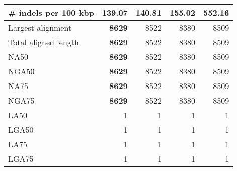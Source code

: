 \documentclass[12pt,a4paper]{article}
\begin{document}
\begin{table}[ht]
\begin{center}
\begin{tabular}{|l*{4}{|r}|}
\# indels per 100 kbp & {\bf 139.07} & 140.81 & 155.02 & 552.16 \\ \hline
Largest alignment & {\bf 8629} & 8522 & 8380 & 8509 \\ \hline
Total aligned length & {\bf 8629} & 8522 & 8380 & 8509 \\ \hline
NA50 & {\bf 8629} & 8522 & 8380 & 8509 \\ \hline
NGA50 & {\bf 8629} & 8522 & 8380 & 8509 \\ \hline
NA75 & {\bf 8629} & 8522 & 8380 & 8509 \\ \hline
NGA75 & {\bf 8629} & 8522 & 8380 & 8509 \\ \hline
LA50 & 1 & 1 & 1 & 1 \\ \hline
LGA50 & 1 & 1 & 1 & 1 \\ \hline
LA75 & 1 & 1 & 1 & 1 \\ \hline
LGA75 & 1 & 1 & 1 & 1 \\ \hline
\end{tabular}
\end{center}
\end{table}
\end{document}
